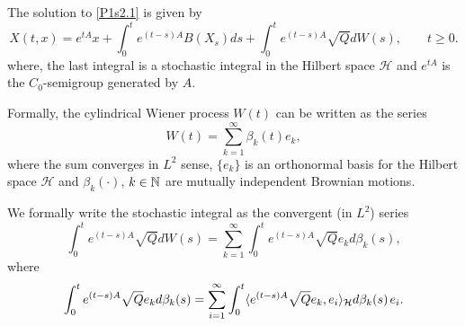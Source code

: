 \documentclass{article}
\numberwithin{equation}{section}
\begin{document}
The solution to \eqref{P1s2.1} is given by
\begin{equation}\label{s2.2}
 X(t,x)=e^{tA}x + \int_0^t e^{(t-s)A}B(X_s) ds  +  \int_0^t e^{(t-s)A}\sqrt{Q}dW(s),\qquad t\ge 0.
\end{equation}
where, the last integral is a stochastic integral in the Hilbert space $\mathcal{H}$ and $e^{tA}$ is the $C_0$-semigroup generated by $A$.
 
 Formally, the cylindrical Wiener process $W(t)$ can be written as the series
 \begin{equation}
  W(t)=\sum_{k=1}^\infty \beta_k(t) e_k,
 \end{equation}
where the sum converges in $L^2$ sense, $\{e_k\}$ is an orthonormal basis for the Hilbert space $\mathcal{H}$ and $\beta_k(\cdot)$, $k\in{\mathbb N}$ 
are mutually independent Brownian motions.

We formally write the stochastic integral as the convergent (in $L^2$) series
\begin{equation}
\int_0^t e^{(t-s)A}\sqrt{Q}dW(s)=\sum_{k=1}^\infty \int_0^t e^{(t-s)A}\sqrt{Q}e_kd\beta_k(s),
 \end{equation}
where 
\begin{equation}
\int_0^t e^{(t-s)A}\sqrt{Q}e_kd\beta_k(s) = \sum_{i=1}^\infty \int_0^t \langle e^{(t-s)A}\sqrt{Q}e_k,e_i\rangle_{\mathcal{H}} d\beta_k(s)\hspace*{0.05cm} e_i. 
 \end{equation}
\end{document}
